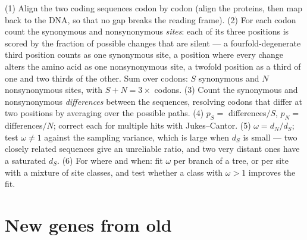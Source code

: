 \begin{method}[Estimating $d_{N}/d_{S}$]\label{met:b3:molecular-evolution:method}
(1) Align the two coding sequences codon by codon (align the proteins,
then map back to the DNA, so that no gap breaks the reading frame).
(2) For each codon count the synonymous and nonsynonymous \emph{sites}:
each of its three positions is scored by the fraction of possible
changes that are silent --- a fourfold-degenerate third position counts
as one synonymous site, a position where every change alters the amino
acid as one nonsynonymous site, a twofold position as a third of one and
two thirds of the other. Sum over codons: $S$ synonymous and $N$
nonsynonymous sites, with $S + N = 3 \times$ codons. (3) Count the
synonymous and nonsynonymous \emph{differences} between the sequences,
resolving codons that differ at two positions by averaging over the
possible paths. (4) $p_{S} = $ differences$/S$, $p_{N} = $ differences$/N$;
correct each for multiple hits with Jukes--Cantor. (5) $\omega =
d_{N}/d_{S}$; test $\omega \ne 1$ against the sampling variance, which
is large when $d_{S}$ is small --- two closely related sequences give
an unreliable ratio, and two very distant ones have a saturated
$d_{S}$. (6) For where and when: fit $\omega$ per branch of a tree, or
per site with a mixture of site classes, and test whether a class with
$\omega > 1$ improves the fit.
\end{method}

\section{New genes from old}

